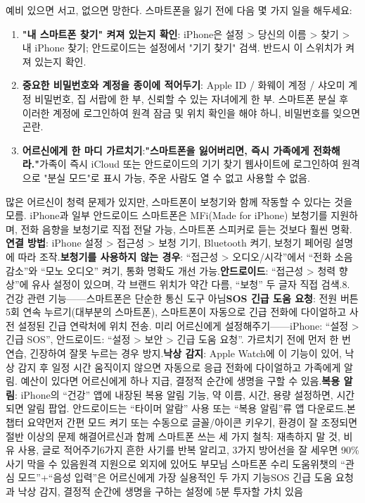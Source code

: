 
예비 있으면 서고, 없으면 망한다. 스마트폰을 잃기 전에 다음 몇 가지 일을 해두세요:

\begin{enumerate}
  \item \textbf{"내 스마트폰 찾기" 켜져 있는지 확인}: iPhone은 설정 > 당신의 이름 > 찾기 > 내 iPhone 찾기; 안드로이드는 설정에서 "기기 찾기" 검색. 반드시 이 스위치가 켜져 있는지 확인.
  \item \textbf{중요한 비밀번호와 계정을 종이에 적어두기}: Apple ID / 화웨이 계정 / 샤오미 계정 비밀번호, 집 서랍에 한 부, 신뢰할 수 있는 자녀에게 한 부. 스마트폰 분실 후 이러한 계정에 로그인하여 원격 잠금 및 위치 확인을 해야 하니, 비밀번호를 잊으면 곤란.
  \item \textbf{어르신에게 한 마디 가르치기}:\textbf{"스마트폰을 잃어버리면, 즉시 가족에게 전화해라."}가족이 즉시 iCloud 또는 안드로이드의 기기 찾기 웹사이트에 로그인하여 원격으로 "분실 모드"로 표시 가능, 주운 사람도 열 수 없고 사용할 수 없음.
\end{enumerate}


많은 어르신이 청력 문제가 있지만, 스마트폰이 보청기와 함께 작동할 수 있다는 것을 모름. iPhone과 일부 안드로이드 스마트폰은 MFi(Made for iPhone) 보청기를 지원하며, 전화 음향을 보청기로 직접 전달 가능, 스마트폰 스피커로 듣는 것보다 훨씬 명확.\textbf{연결 방법}: iPhone 설정 > 접근성 > 보청 기기, Bluetooth 켜기, 보청기 페어링 설명에 따라 조작.\textbf{보청기를 사용하지 않는 경우}: “접근성 > 오디오/시각”에서 “전화 소음 감소”와 “모노 오디오” 켜기, 통화 명확도 개선 가능.\textbf{안드로이드}: “접근성 > 청력 향상”에 유사 설정이 있으며, 각 브랜드 위치가 약간 다름, “보청” 두 글자 직접 검색.8. 건강 관련 기능——스마트폰은 단순한 통신 도구 아님\textbf{SOS 긴급 도움 요청}: 전원 버튼 5회 연속 누르기(대부분의 스마트폰), 스마트폰이 자동으로 긴급 전화에 다이얼하고 사전 설정된 긴급 연락처에 위치 전송. 미리 어르신에게 설정해주기——iPhone: “설정 > 긴급 SOS”, 안드로이드: “설정 > 보안 > 긴급 도움 요청”. 가르치기 전에 먼저 한 번 연습, 긴장하여 잘못 누르는 경우 방지.\textbf{낙상 감지}: Apple Watch에 이 기능이 있어, 낙상 감지 후 일정 시간 움직이지 않으면 자동으로 응급 전화에 다이얼하고 가족에게 알림. 예산이 있다면 어르신에게 하나 지급, 결정적 순간에 생명을 구할 수 있음.\textbf{복용 알림}: iPhone의 “건강” 앱에 내장된 복용 알림 기능, 약 이름, 시간, 용량 설정하면, 시간 되면 알림 팝업. 안드로이드는 “타이머 알람” 사용 또는 “복용 알림”류 앱 다운로드.본 챕터 요약먼저 간편 모드 켜기 또는 수동으로 글꼴/아이콘 키우기, 환경이 잘 조정되면 절반 이상의 문제 해결어르신과 함께 스마트폰 쓰는 세 가지 철칙: 재촉하지 말 것, 비유 사용, 글로 적어주기6가지 흔한 사기를 반복 알리고, 3가지 방어선을 잘 세우면 90\% 사기 막을 수 있음원격 지원으로 외지에 있어도 부모님 스마트폰 수리 도움위챗의 “관심 모드”+“음성 입력”은 어르신에게 가장 실용적인 두 가지 기능SOS 긴급 도움 요청과 낙상 감지, 결정적 순간에 생명을 구하는 설정에 5분 투자할 가치 있음
